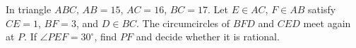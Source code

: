 In triangle $ABC$, $AB=15$, $AC=16$, $BC=17$. Let $E\in AC$, $F\in AB$ satisfy $CE=1$, $BF=3$, and $D\in BC$. The circumcircles of $BFD$ and $CED$ meet again at $P$. If $\angle PEF=30^\circ$, find $PF$ and decide whether it is rational.
